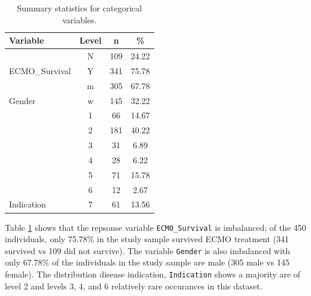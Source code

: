 \documentclass[12pt,]{article}
\begin{document}
\begin{table}[!h]

\caption{\label{tab:unnamed-chunk-1}\label{tab:categorical-summaries} Summary statistics for categorical variables.}
\centering
\fontsize{10}{12}\selectfont
\begin{tabular}{lccc}
\toprule
Variable & Level & n & \%\\
\midrule
 & N & 109 & 24.22\\

\multirow{-2}{*}{\raggedright\arraybackslash ECMO\_Survival} & Y & 341 & 75.78\\
\cmidrule{1-4}
 & m & 305 & 67.78\\

\multirow{-2}{*}{\raggedright\arraybackslash Gender} & w & 145 & 32.22\\
\cmidrule{1-4}
 & 1 & 66 & 14.67\\

 & 2 & 181 & 40.22\\

 & 3 & 31 & 6.89\\

 & 4 & 28 & 6.22\\

 & 5 & 71 & 15.78\\

 & 6 & 12 & 2.67\\

\multirow{-7}{*}{\raggedright\arraybackslash Indication} & 7 & 61 & 13.56\\
\bottomrule
\end{tabular}
\end{table}

Table \ref{tab:categorical-summaries} shows that the repsonse variable
\texttt{ECMO\_Survival} is imbalanced; of the 450 individuals, only
75.78\% in the study sample survived ECMO treatment (341 survived vs 109
did not survive). The variable \texttt{Gender} is also imbalanced with
only 67.78\% of the individuals in the study sample are male (305 male
vs 145 female). The distribution disease indication, \texttt{Indication}
shows a majority are of level 2 and levels 3, 4, and 6 relatively rare
occurances in this dataset.
\end{document}
